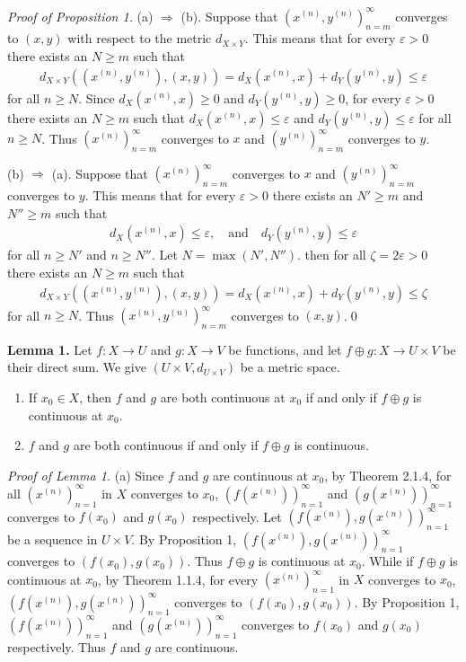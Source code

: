 \documentclass{book}
\newcommand{\titl}[1]{\noindent\textbf{#1}}
\begin{document}
\noindent\emph{Proof of Proposition 1.} (a) $\Rightarrow$ (b). Suppose that $(x^{(n)},y^{(n)})_{n=m}^{\infty}$ converges to $(x,y)$ with respect to the metric $d_{X\times Y}$. This means that for every $\varepsilon>0$ there exists an $N\geq m$ such that
    \begin{align*}
        d_{X\times Y}((x^{(n)},y^{(n)}),(x,y))=d_X(x^{(n)},x)+d_Y(y^{(n)},y)\leq\varepsilon
    \end{align*}
for all $n\geq N$. Since $d_X(x^{(n)},x)\geq 0$ and $d_Y(y^{(n)},y)\geq 0$, for every $\varepsilon>0$ there exists an $N\geq m$ such that $d_X(x^{(n)},x)\leq\varepsilon$ and $d_Y(y^{(n)},y)\leq\varepsilon$ for all $n\geq N$. Thus $(x^{(n)})_{n=m}^{\infty}$ converges to $x$ and $(y^{(n)})_{n=m}^{\infty}$ converges to $y$.

(b) $\Rightarrow$ (a). Suppose that $(x^{(n)})_{n=m}^{\infty}$ converges to $x$ and $(y^{(n)})_{n=m}^{\infty}$ converges to $y$. This means that for every $\varepsilon>0$ there exists an $N'\geq m$ and $N''\geq m$ such that
    \begin{align*}
        d_X(x^{(n)},x)\leq\varepsilon,\quad\text{and}\quad d_Y(y^{(n)},y)\leq\varepsilon
    \end{align*}
for all $n\geq N'$ and $n\geq N''$. Let $N=\max(N',N'')$. then for all $\zeta=2\varepsilon>0$ there exists an $N\geq m$ such that
    \begin{align*}
        d_{X\times Y}((x^{(n)},y^{(n)}),(x,y))=d_X(x^{(n)},x)+d_Y(y^{(n)},y)\leq\zeta
    \end{align*}
for all $n\geq N$. Thus $(x^{(n)},y^{(n)})_{n=m}^{\infty}$ converges to $(x,y)$.\qed

\begin{framed}
\titl{Lemma 1.} Let $f:X\to U$ and $g:X\to V$ be functions, and let $f\oplus g:X\to U\times V$ be their direct sum. We give $(U\times V,d_{U\times V})$ be a metric space.
\begin{enumerate}
    \item If $x_0\in X$, then $f$ and $g$ are both continuous at $x_0$ if and only if $f\oplus g$ is continuous at $x_0$.
    \item $f$ and $g$ are both continuous if and only if $f\oplus g$ is continuous.
\end{enumerate}
\end{framed}

\noindent\emph{Proof of Lemma 1.} (a) Since $f$ and $g$ are continuous at $x_0$, by Theorem 2.1.4, for all $(x^{(n)})_{n=1}^{\infty}$ in $X$ converges to $x_0$, $(f(x^{(n)}))_{n=1}^{\infty}$ and $(g(x^{(n)}))_{n=1}^{\infty}$ converges to $f(x_0)$ and $g(x_0)$ respectively. Let $(f(x^{(n)}),g(x^{(n)}))_{n=1}^{\infty}$ be a sequence in $U\times V$. By Proposition 1, $(f(x^{(n)}),g(x^{(n)}))_{n=1}^{\infty}$ converges to $(f(x_0),g(x_0))$. Thus $f\oplus g$ is continuous at $x_0$. While if $f\oplus g$ is continuous at $x_0$, by Theorem 1.1.4, for every $(x^{(n)})_{n=1}^{\infty}$ in $X$ converges to $x_0$, $(f(x^{(n)}),g(x^{(n)}))_{n=1}^{\infty}$ converges to $(f(x_0),g(x_0))$. By Proposition 1, $(f(x^{(n)}))_{n=1}^{\infty}$ and $(g(x^{(n)}))_{n=1}^{\infty}$ converges to $f(x_0)$ and $g(x_0)$ respectively. Thus $f$ and $g$ are continuous.
\end{document}
